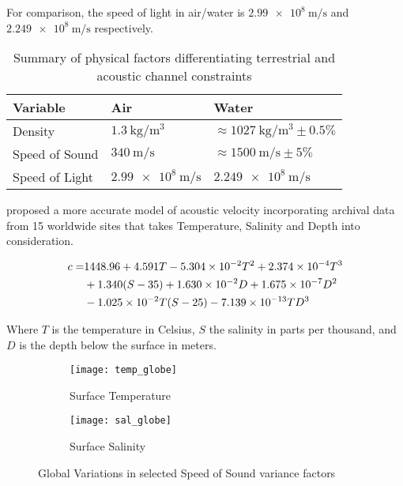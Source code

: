 For comparison, the speed of light in air/water is $\SI{2.99e8}{\meter\per\second}$ and $\SI{2.249e8}{\meter\per\second}$ respectively. 

\begin{table}
	\centering
	\caption{Summary of physical factors differentiating terrestrial and acoustic channel constraints}
	\label{tab:channel_constraings_comp}
	\begin{tabularx}{0.8\textwidth}{X X X}\toprule
		Variable & Air & Water\\
		\midrule
		Density & $\SI{1.3}{\kilogram\per\meter\cubed}$ & $\approx\SI{1027}{\kilogram\per\meter\cubed}\pm0.5\%$ \\
		Speed of Sound & $\SI{340}{\meter\per\second}$ & $\approx\SI{1500}{\meter\per\second}\pm 5\%$ \\
		Speed of Light & $\SI{2.99e8}{\meter\per\second}$ & $\SI{2.249e8}{\meter\per\second}$\\
		\bottomrule
	\end{tabularx}
\end{table}
\citet{Mackenzie1981} proposed a more accurate model of acoustic velocity incorporating archival data from 15 worldwide sites that takes Temperature, Salinity and Depth into consideration.

\begin{align}
  c = & 1448.96 + 4.591 T - 5.304 \times 10^{-2} T^2 + 2.374 \times 10^{-4}T^{3}\notag\\
  & +1.340 (S-35) + 1.630\times 10^{-2}D+1.675\times 10^{-7}D^2\\
  & -1.025 \times 10^{-2}T(S-25) - 7.139\times 10^{-13}TD^3\notag
  \label{equ:mackenzie}
\end{align}

Where $T$ is the temperature in Celsius, $S$ the salinity in parts per thousand, and $D$ is the depth below the surface in meters.

\begin{figure}
	\centering
	\begin{subfigure}[t]{0.8\textwidth}
		\centering
		\texttt{[image: temp\_globe]}
		\caption{Surface Temperature}
		\label{fig:temp_globe}
	\end{subfigure}
	\begin{subfigure}[t]{0.8\textwidth}
		\centering
		\texttt{[image: sal\_globe]}
		\caption{Surface Salinity}
		\label{fig:sal_globe}
	\end{subfigure}
	\caption{Global Variations in selected Speed of Sound variance factors}
	\label{fig:globes}
\end{figure}

